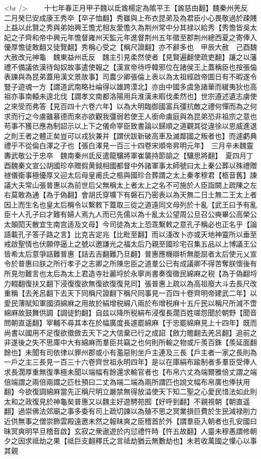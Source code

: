 <br />
　　十七年春正月甲子魏以氐酋楊定為隂平王【酋慈由翻】魏秦州羌反　二月癸巳安成康王秀卒【卒子恤翻】秀雖與上布衣昆弟及為君臣小心畏敬過於疎賤上益以此賢之秀與弟始興王憺尤相友愛憺久為荆州常中分其禄以給秀【秀憺皆吳太妃之子齊和帝中興元年憺督雍州天監元年進督荆州五年徵至郡荆州總西夏之寄俸入優厚憺徒敢翻又徒覽翻】秀稱心受之【稱尺證翻】亦不辭多也　甲辰大赦　己酉魏大赦改元神龜　魏東益州氐反　魏主引見柔然使者【見賢遍翻使疏吏翻】讓之以藩禮不備議依漢待匈奴故事遣使報之【漢宣帝待呼韓邪位在諸侯王上蓋稱臣也按張倫表諫與為昆弟蓋用漢文景故事】司農少卿張倫上表以為太祖經啟帝圖日有不暇遂令豎子遊魂一方【謂道武南略社崘得以雄跨漠北】亦由中國多虞急諸華而緩夷狄也高祖亦事南轅未遑北伐【謂孝文南都洛陽用兵淮漢未暇伐柔然也】世宗遵述遺志虜使之來受而弗答【見百四十六卷六年】以為大明臨御國富兵彊抗敵之禮何憚而為之何求而行之今虜雖慕德而來亦欲觀我彊弱若使王人銜命虜庭與為昆弟恐非祖宗之意也苟事不獲已應為制詔示以上下之儀命宰臣致書論以歸順之道觀其從違徐以恩威進退之則王者之體正矣豈可以戎狄兼并【謂伏跋新破高車及滅鄰國之叛者也】而遽虧典禮乎不從倫白澤之子也【張白澤見一百三十四卷宋順帝昇明元年】　三月辛未魏靈夀武敬公于忠卒　魏南秦州氐反遣龍驤將軍崔襲持節諭之【驤思將翻】　夏四月丁酉魏秦文宣公胡國珍卒贈假黄鉞相國都督中外諸軍事太師號曰太上秦公葬以殊禮贈禭儀衛事極優厚又迎太后母皇甫氏之柩與國珍合葬謂之太上秦孝穆君【柩音舊】諫議大夫常山張普惠以為前世后父無稱太上者太上之名不可施於人臣詣闕上疏陳之左右莫敢為通【為于偽翻】會胡氏穿壙下有磐石乃密表以為天無二日土無二王太上者因上而生名也皇太后稱令以繫敕下蓋取三從之道遠同文母列於十亂【武王曰予有亂臣十人孔子曰才難有婦人焉九人而已先儒以為十亂太公望周公旦召公奭畢公高榮公太顛閎天散宜生南宫适及文母】今司徒為太上恐乖繫敕之意孔子稱必也正名乎【論語載孔子答子路之言】比克吉定兆【比毗至翻】而以淺改卜亦或天地神靈所以垂至戒啟聖情也伏願停逼上之號以邀謙光之福太后乃親至國珍宅召集五品以上博議王公皆希太后意爭詰難普惠【詰去吉翻難乃旦翻】普惠應機辯析無能屈者太后使元乂宣令於普惠曰朕之所行孝子之志卿之所陳忠臣之道羣公已有成議卿不得苦奪朕懷後有所見勿難言也太后為太上君造寺壯麗埒於永寧尚書奏復徵民綿麻之税【為于偽翻埒力輟翻復扶又翻下浸復復欲無復欲復復見同】張普惠上疏以為高祖廢大斗去長尺改重稱【去羌呂翻下去天下同稱尺證翻下稱尺同事見一百四十卷齊明帝建武二年】以愛民薄賦知軍國須綿麻之用故於絹增税綿八兩於布增税麻十五斤民以稱尺所減不啻綿麻故鼓舞供調【調徒釣翻】自兹以降所税絹布浸復長濶百姓嗟怨聞於朝野【聞音問朝直遥翻】宰輔不尋其本在於幅廣度長遽罷綿麻【于忠罷綿麻見上十四年】既而尚書以國用不足復欲徵斂去天下之大信棄已行之成詔【斂力贍翻去羌呂翻】追前之非遂後之失不思庫中大有綿麻而羣臣共竊之也何則所輸之物或斤羨百銖【羨延面翻餘也】未聞有司依律以罪州郡或小有濫惡則坐戶主連及三長【戶主者一家之長則為一戶之主三長見一百三十六卷齊世祖永明四年】是以在庫絹布踰制者多羣臣受俸人求長濶厚重無復準極未聞以端幅有餘還求輸官者也【布帛六丈為端爾雅倍丈謂之端倍端謂之兩倍兩謂之匹杜預曰二丈為端二端為兩所謂匹也說文幅布帛廣也俸扶用翻】今欲復調綿麻當先正稱尺明立嚴禁無得放溢使天下知二聖之心愛民惜法如此則太和之政復見於神龜矣普惠又以魏主好遊騁苑囿【好呼到翻】不親視朝【朝直遥翻】過崇佛法郊廟之事多委有司上疏切諫以為殖不思之冥業損巨費於生民減禄削力近供無事之僧崇飾雲殿遠邀未然之報昧爽之臣稽首於外【謂羣臣入朝者也孔安國曰昧冥爽明早旦稽音啟】玄寂之衆遨遊於内愆禮忤時【忤五故翻】人靈未穆愚謂修朝夕之因求祗劫之果【祗巨支翻釋氏之言祗劫猶云無數劫也】未若收萬國之懽心以事其親